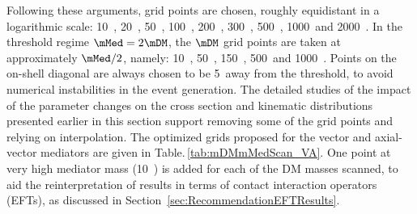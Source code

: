 Following these arguments, \mMed grid points are chosen, roughly equidistant in a logarithmic scale: 10~\gev, 20~\gev, 50~\gev,  100~\gev, 200~\gev, 300~\gev, 500~\gev, 1000~\gev and 2000~\gev. In the threshold regime $\mMed=2\mDM$, the $\mDM$ grid points are taken at approximately $\mMed/2$, namely: 10~\gev, 50~\gev, 150~\gev, 500~\gev and 1000~\gev. Points on the on-shell diagonal are always chosen to be 5~\gev away from the threshold, to avoid numerical instabilities in the event generation. 
The detailed studies of the impact of the parameter changes on the cross section and kinematic distributions presented earlier in this section support removing some of the grid points and relying on interpolation. The optimized grids proposed for the vector and axial-vector mediators are given in Table.\,\ref{tab:mDMmMedScan_VA}.
One point at very high mediator mass (10~\tev) is added for each of the DM masses scanned, to aid the reinterpretation of results in terms of contact interaction operators (EFTs), as discussed in Section~\ref{sec:RecommendationEFTResults}. 



